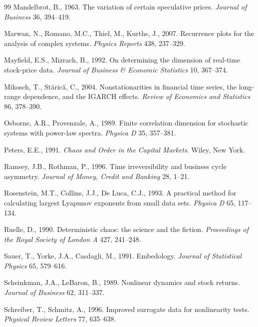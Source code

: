 \documentclass[11pt,a4paper]{article}
\begin{document}
\begin{thebibliography}{99}
Mandelbrot, B., 1963. The variation of certain speculative prices. \emph{Journal of Business} 36, 394--419.

Marwan, N., Romano, M.C., Thiel, M., Kurths, J., 2007. Recurrence plots for the analysis of complex systems.
\emph{Physics Reports} 438, 237--329.

Mayfield, E.S., Mizrach, B., 1992. On determining the dimension of real-time stock-price data. \emph{Journal of
Business \& Economic Statistics} 10, 367--374.

Mikosch, T., St\u{a}ric\u{a}, C., 2004. Nonstationarities in financial time series, the long-range dependence, and the
IGARCH effects. \emph{Review of Economics and Statistics} 86, 378--390.

Osborne, A.R., Provenzale, A., 1989. Finite correlation dimension for stochastic systems with power-law spectra.
\emph{Physica D} 35, 357--381.

Peters, E.E., 1991. \emph{Chaos and Order in the Capital Markets}. Wiley, New York.

Ramsey, J.B., Rothman, P., 1996. Time irreversibility and business cycle asymmetry. \emph{Journal of Money, Credit and
Banking} 28, 1--21.

Rosenstein, M.T., Collins, J.J., De Luca, C.J., 1993. A practical method for calculating largest Lyapunov exponents from
small data sets. \emph{Physica D} 65, 117--134.

Ruelle, D., 1990. Deterministic chaos: the science and the fiction. \emph{Proceedings of the Royal Society of London A}
427, 241--248.

Sauer, T., Yorke, J.A., Casdagli, M., 1991. Embedology. \emph{Journal of Statistical Physics} 65, 579--616.

Scheinkman, J.A., LeBaron, B., 1989. Nonlinear dynamics and stock returns. \emph{Journal of Business} 62, 311--337.

Schreiber, T., Schmitz, A., 1996. Improved surrogate data for nonlinearity tests. \emph{Physical Review Letters} 77,
635--638.


\end{thebibliography}
\end{document}
